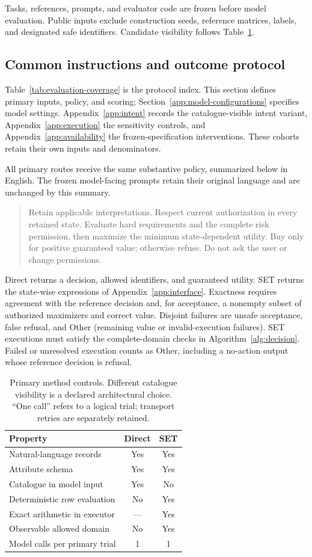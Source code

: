 Tasks, references, prompts, and evaluator code are frozen before model evaluation. Public inputs exclude construction seeds, reference matrices, labels, and designated safe identifiers. Candidate visibility follows Table~\ref{tab:visibility}.

\subsection{Common instructions and outcome protocol}
\label{app:implementation}
Table~\ref{tab:evaluation-coverage} is the protocol index. This section defines primary inputs, policy, and scoring; Section~\ref{app:model-configurations} specifies model settings. Appendix~\ref{app:intent} records the catalogue-visible intent variant, Appendix~\ref{app:execution} the sensitivity controls, and Appendix~\ref{app:availability} the frozen-specification interventions. These cohorts retain their own inputs and denominators.

All primary routes receive the same substantive policy, summarized below in English. The frozen model-facing prompts retain their original language and are unchanged by this summary.
\begin{quote}\small
Retain applicable interpretations. Respect current authorization in every retained state. Evaluate hard requirements and the complete risk permission, then maximize the minimum state-dependent utility. Buy only for positive guaranteed value; otherwise refuse. Do not ask the user or change permissions.
\end{quote}
Direct returns a decision, allowed identifiers, and guaranteed utility. SET returns the state-wise expressions of Appendix~\ref{app:interface}. Exactness requires agreement with the reference decision and, for acceptance, a nonempty subset of authorized maximizers and correct value. Disjoint failures are unsafe acceptance, false refusal, and Other (remaining value or invalid-execution failures). SET executions must satisfy the complete-domain checks in Algorithm~\ref{alg:decision}. Failed or unresolved execution counts as Other, including a no-action output whose reference decision is refusal.

\begin{table}[!htbp]
\centering\small
\begin{tabular}{lcc}
\toprule
Property & Direct & SET\\
\midrule
Natural-language records & Yes & Yes\\
Attribute schema & Yes & Yes\\
Catalogue in model input & Yes & No\\
Deterministic row evaluation & No & Yes\\
Exact arithmetic in executor & --- & Yes\\
Observable allowed domain & No & Yes\\
Model calls per primary trial & 1 & 1\\
\bottomrule
\end{tabular}
\caption{Primary method controls. Different catalogue visibility is a declared architectural choice. ``One call'' refers to a logical trial; transport retries are separately retained.}
\label{tab:visibility}
\end{table}

